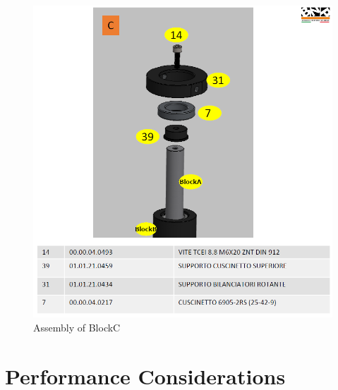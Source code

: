 \begin{figure} [h]
\centering
\includegraphics[width=1.0
\textwidth]{figures/Magistrale/ass_obj_3}
\caption[BlockC Assembly]{Assembly of BlockC
\label{fig:ass_obj_3}}
\end{figure} 


\section{Performance Considerations}\label{sec:perf_consid}


